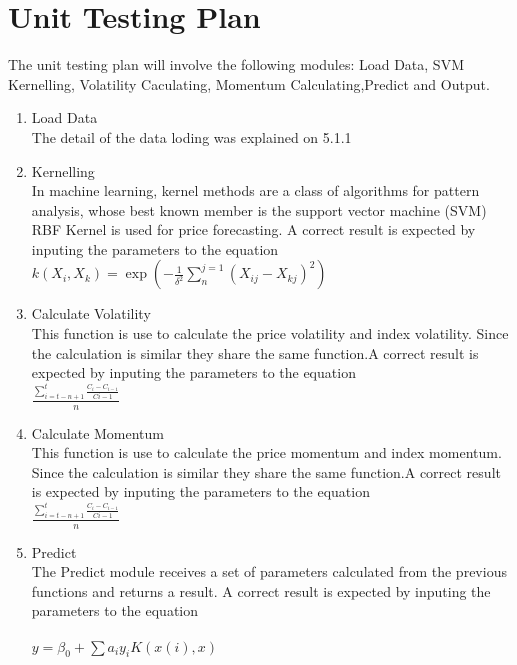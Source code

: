 \documentclass[12pt, titlepage]{article}
\begin{document}
\section{Unit Testing Plan}
The unit testing plan will involve the following modules: Load Data, SVM Kernelling, Volatility Caculating, Momentum Calculating,Predict and Output.\\
\begin{enumerate}

\item{ Load Data\\}
The detail of the data loding was explained on 5.1.1
\item{ Kernelling\\}
In machine learning, kernel methods are a class of algorithms for pattern analysis, whose best known member is the support vector machine (SVM)
RBF Kernel is used for price forecasting. A correct result is expected by inputing the parameters to the equation \\
$k\left (X_i,X_k\right )=\exp \left ( -\frac1{\delta^2}\sum_{n}^{j=1}(X_{ij}-X_{kj})^2 \right )$ \\

\item{ Calculate Volatility\\}
This function is use to calculate the price volatility and index volatility. Since the calculation is similar they share the same function.A correct result is expected by inputing the parameters to the equation \\
$\frac{\sum_{i=t-n+1}^{t} \frac{C_i-C_{i-1}}{C{i-1}}}{n}$   \\				

\item{ Calculate Momentum\\}
This function is use to calculate the price momentum and index momentum. Since the calculation is similar they share the same function.A correct result is expected by inputing the parameters to the equation \\
$\frac{\sum_{i=t-n+1}^{t} \frac{C_i-C_{i-1}}{C{i-1}}}{n}$   \\	

\item{Predict \\}
The Predict module receives a set of parameters calculated from the previous functions and returns a result.  A correct result is expected by inputing the parameters to the equation \\\\
$y=\beta _0+\sum {a_iy_iK(x(i),x)}$\\

\end{enumerate}		
\end{document}
